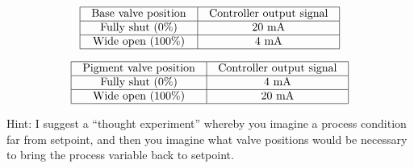 

$$\vbox{\offinterlineskip
\halign{\strut
\vrule \quad\hfil # \ \hfil & 
\vrule \quad\hfil # \ \hfil \vrule \cr
\noalign{\hrule}
%
Base valve position & Controller output signal \cr
%
\noalign{\hrule}
%
Fully shut (0\%) & 20 mA \cr
%
\noalign{\hrule}
%
Wide open (100\%) & 4 mA \cr
%
\noalign{\hrule}
} %
}$$ %


$$\vbox{\offinterlineskip
\halign{\strut
\vrule \quad\hfil # \ \hfil & 
\vrule \quad\hfil # \ \hfil \vrule \cr
\noalign{\hrule}
%
Pigment valve position & Controller output signal \cr
%
\noalign{\hrule}
%
Fully shut (0\%) & 4 mA \cr
%
\noalign{\hrule}
%
Wide open (100\%) & 20 mA \cr
%
\noalign{\hrule}
} %
}$$ %

\vskip 10pt

Hint: I suggest a ``thought experiment'' whereby you imagine a process condition far from setpoint, and then you imagine what valve positions would be necessary to bring the process variable back to setpoint.











